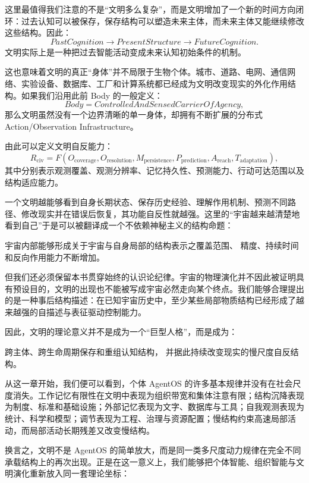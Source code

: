 这里最值得我们注意的不是“文明多么复杂”，而是文明增加了一个新的时间方向闭环：过去认知可以被保存，保存结构可以塑造未来主体，而未来主体又能继续修改这些结构。因此：
\[
PastCognition
\rightarrow
PresentStructure
\rightarrow
FutureCognition.
\]
文明实际上是一种把过去智能活动变成未来认知初始条件的机制。

这也意味着文明的真正“身体”并不局限于生物个体。城市、道路、电网、通信网络、实验设备、数据库、工厂和计算系统都已经成为文明改变现实的外化作用结构。如果我们沿用此前 Body 的一般定义：
\[
Body
=
ControlledAndSensedCarrierOfAgency,
\]
那么文明虽然没有一个边界清晰的单一身体，却拥有不断扩展的分布式 Action/Observation Infrastructure。

由此可以定义文明自反能力：
\[
R_{\mathrm{civ}}
=
F(
O_{\mathrm{coverage}},
O_{\mathrm{resolution}},
M_{\mathrm{persistence}},
P_{\mathrm{prediction}},
A_{\mathrm{reach}},
T_{\mathrm{adaptation}}
),
\]
其中分别表示观测覆盖、观测分辨率、记忆持久性、预测能力、行动可达范围以及结构适应能力。

一个文明越能够看到自身长期状态、保存历史经验、理解作用机制、预测不同路径、修改现实并在错误后恢复，其功能自反性就越强。这里的“宇宙越来越清楚地看到自己”于是可以被翻译成一个不依赖神秘主义的结构命题：
\begin{proposition*}
宇宙内部能够形成关于宇宙与自身局部的结构表示之覆盖范围、
精度、持续时间和反向作用能力不断增加。
\end{proposition*}

但我们还必须保留本书贯穿始终的认识论纪律。宇宙的物理演化并不因此被证明具有预设目的，文明的出现也不能被写成宇宙必然走向某个终点。我们能够合理提出的是一种事后结构描述：在已知宇宙历史中，至少某些局部物质结构已经形成了越来越强的自描述与表征驱动控制能力。

因此，文明的理论意义并不是成为一个“巨型人格”，而是成为：
\begin{statementbox}
跨主体、跨生命周期保存和重组认知结构，
并据此持续改变现实的慢尺度自反结构。
\end{statementbox}

从这一章开始，我们便可以看到，个体 AgentOS 的许多基本规律并没有在社会尺度消失。工作记忆有限性在文明中表现为组织带宽和集体注意有限；结构沉降表现为制度、标准和基础设施；外部记忆表现为文字、数据库与工具；自我观测表现为统计、科学和模型；调节表现为工程、治理与资源配置；慢结构约束高速局部活动，而局部活动长期残差又改变慢结构。

换言之，文明不是 AgentOS 的简单放大，而是同一类多尺度动力规律在完全不同承载结构上的再次出现。正是在这一意义上，我们能够把个体智能、组织智能与文明演化重新放入同一套理论坐标：

